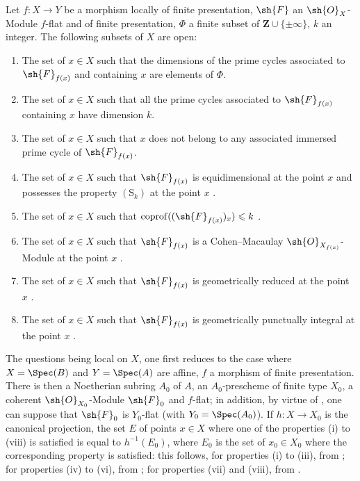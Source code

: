 
\begin{theorem}[12.1.1]
\label{IV.12.1.1}
Let $f:X\to Y$ be a morphism locally of finite presentation, $\sh{F}$ an $\sh{O}_X$-Module $f$-flat and of finite presentation, $\Phi$ a finite subset of $\mathbf{Z}\cup\{\pm\infty\}$, $k$ an integer.
The following subsets of $X$ are open:
\begin{enumerate}[label=(\roman*)]
  \item The set of $x\in X$ such that the dimensions of the prime cycles associated to $\sh{F}_{f(x)}$ and containing $x$ are elements of $\Phi$.
  \item The set of $x\in X$ such that all the prime cycles associated to $\sh{F}_{f(x)}$ containing $x$ have dimension $k$.
  \item The set of $x\in X$ such that $x$ does not belong to any associated immersed prime cycle of $\sh{F}_{f(x)}$.
  \item The set of $x\in X$ such that $\sh{F}_{f(x)}$ is equidimensional at the point $x$ and possesses the property $(\mathrm{S}_k)$ at the point $x$ .
  \item The set of $x\in X$ such that $\operatorname{coprof}((\sh{F}_{f(x)})_x)\leqslant k$ .
  \item The set of $x\in X$ such that $\sh{F}_{f(x)}$ is a Cohen--Macaulay $\sh{O}_{X_{f(x)}}$-Module at the point $x$ .
  \item The set of $x\in X$ such that $\sh{F}_{f(x)}$ is geometrically reduced at the point $x$ .
  \item The set of $x\in X$ such that $\sh{F}_{f(x)}$ is geometrically punctually integral at the point $x$ .
\end{enumerate}

The questions being local on $X$, one first reduces to the case where $X=\Spec(B)$ and $Y=\Spec(A)$ are affine, $f$ a morphism of finite presentation.
There is then a Noetherian subring $A_0$ of $A$, an $A_0$-prescheme of finite type $X_0$, a coherent $\sh{O}_{X_0}$-Module $\sh{F}_0$ and $f$-flat; in addition, by virtue of , one can suppose that $\sh{F}_0$ is $Y_0$-flat (with $Y_0=\Spec(A_0)$).
If $h:X\to X_0$ is the canonical projection, the set $E$ of points $x\in X$ where one of the properties (i) to (viii) is satisfied is equal to $h^{-1}(E_0)$, where $E_0$ is the set of $x_0\in X_0$ where the corresponding property is satisfied: this follows, for properties (i) to (iii), from ; for properties (iv) to (vi), from ; for properties (vii) and (viii), from .
\end{theorem}

